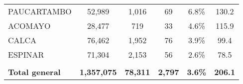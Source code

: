 \begin{tabular}{lccccc}
	\cellcolor[HTML]{FFE699}PAUCARTAMBO                             & 52,989               & 1,016                      & 69                   & 6.8\%                      & 130.2                                       \\
	\cellcolor[HTML]{FFE699}ACOMAYO                                 & 28,477               & 719                        & 33                   & 4.6\%                      & 115.9                                       \\
	\cellcolor[HTML]{FFE699}CALCA                                   & 76,462               & 1,952                      & 76                   & 3.9\%                      & 99.4                                        \\
	\cellcolor[HTML]{FFE699}ESPINAR                                 & 71,304               & 2,153                      & 56                   & 2.6\%                      & 78.5                                        \\
	& \multicolumn{1}{l}{} & \multicolumn{1}{l}{}       & \multicolumn{1}{l}{} & \multicolumn{1}{l}{}       & \multicolumn{1}{l}{}                        \\
	\rowcolor[HTML]{DDEBF7} 
	\textbf{Total general}                                          & \textbf{1,357,075}   & \textbf{78,311}            & \textbf{2,797}       & \textbf{3.6\%}             & \textbf{206.1}                             
\end{tabular}